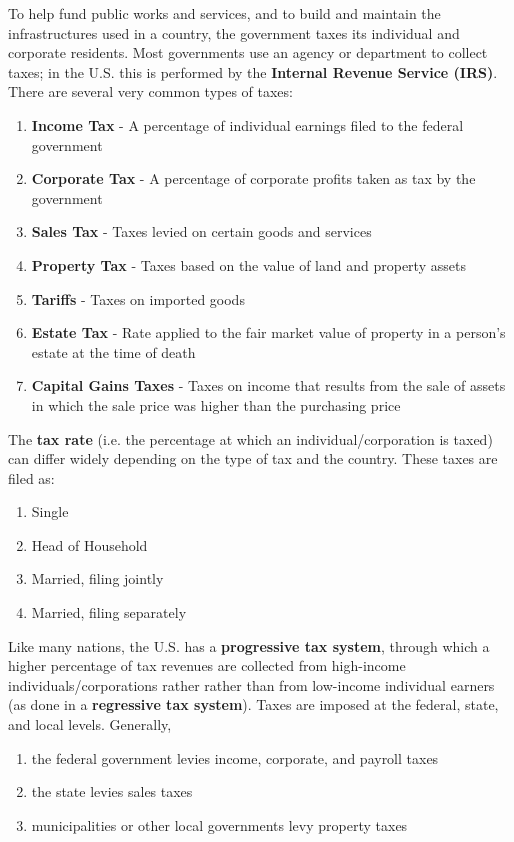 \documentclass{article}
\begin{document}
  \begin{definition}[Taxes]
    To help fund public works and services, and to build and maintain the infrastructures used in a country, the government taxes its individual and corporate residents. Most governments use an agency or department to collect taxes; in the U.S. this is performed by the \textbf{Internal Revenue Service (IRS)}. There are several very common types of taxes: 
    \begin{enumerate}
      \item \textbf{Income Tax} - A percentage of individual earnings filed to the federal government
      \item \textbf{Corporate Tax} - A percentage of corporate profits taken as tax by the government
      \item \textbf{Sales Tax} - Taxes levied on certain goods and services
      \item \textbf{Property Tax} - Taxes based on the value of land and property assets
      \item \textbf{Tariffs} - Taxes on imported goods
      \item \textbf{Estate Tax} - Rate applied to the fair market value of property in a person's estate at the time of death
      \item \textbf{Capital Gains Taxes} - Taxes on income that results from the sale of assets in which the sale price was higher than the purchasing price 
    \end{enumerate}
    The \textbf{tax rate} (i.e. the percentage at which an individual/corporation is taxed) can differ widely depending on the type of tax and the country. These taxes are filed as: 
    \begin{enumerate}
      \item Single
      \item Head of Household
      \item Married, filing jointly
      \item Married, filing separately 
    \end{enumerate}
  \end{definition}

  \begin{definition}
    Like many nations, the U.S. has a \textbf{progressive tax system}, through which a higher percentage of tax revenues are collected from high-income individuals/corporations rather rather than from low-income individual earners (as done in a \textbf{regressive tax system}). Taxes are imposed at the federal, state, and local levels. Generally, 
    \begin{enumerate}
      \item the federal government levies income, corporate, and payroll taxes
      \item the state levies sales taxes
      \item municipalities or other local governments levy property taxes
    \end{enumerate}
  \end{definition}
\end{document}

